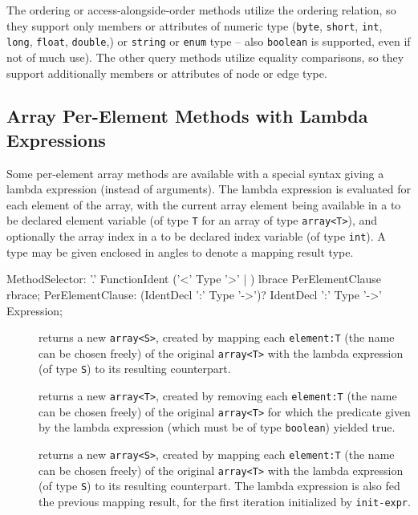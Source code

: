 The ordering or access-alongside-order methods utilize the ordering relation, so they support only members or attributes of numeric type (\texttt{byte}, \texttt{short}, \texttt{int}, \texttt{long}, \texttt{float}, \texttt{double},) or \texttt{string} or \texttt{enum} type -- also \texttt{boolean} is supported, even if not of much use).
The other query methods utilize equality comparisons, so they support additionally members or attributes of node or edge type.

\subsection{Array Per-Element Methods with Lambda Expressions} 

Some per-element array methods are available with a special syntax giving a lambda expression (instead of arguments).
The lambda expression is evaluated for each element of the array, with the current array element being available in a to be declared element variable (of type \texttt{T} for an array of type \texttt{array<T>}), and optionally the array index in a to be declared index variable (of type \texttt{int}).
A type may be given enclosed in angles to denote a mapping result type.

\begin{rail}
  MethodSelector: '.' FunctionIdent ('<' Type '>' | ) lbrace PerElementClause rbrace;
  PerElementClause: (IdentDecl ':' Type '->')? IdentDecl ':' Type '->' Expression;
\end{rail}

\begin{description}
\item[] returns a new \texttt{array<S>},
   created by mapping each \texttt{element:T} (the name can be chosen freely) of the original \texttt{array<T>} with the lambda expression (of type \texttt{S}) to its resulting counterpart.
\item[] returns a new \texttt{array<T>},
   created by removing each \texttt{element:T} (the name can be chosen freely) of the original \texttt{array<T>} for which the predicate given by the lambda expression (which must be of type \texttt{boolean}) yielded true.
\item[]
 returns a new \texttt{array<S>},
   created by mapping each \texttt{element:T} (the name can be chosen freely) of the original \texttt{array<T>} with the lambda expression (of type \texttt{S}) to its resulting counterpart.
	The lambda expression is also fed the previous mapping result, for the first iteration initialized by \texttt{init-expr}.
\end{description}

